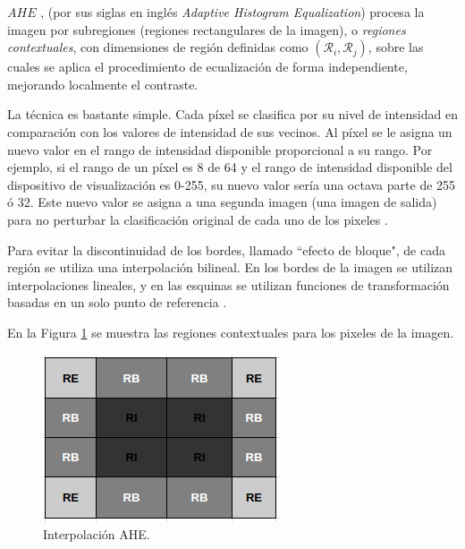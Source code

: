 $AHE$ \cite{chulwoo2013}, (por sus siglas en inglés \textit{Adaptive Histogram Equalization}) procesa la imagen por subregiones (regiones rectangulares de la imagen), o {\it regiones contextuales}, con dimensiones de región definidas como $(\mathcal{R}_i,\mathcal{R}_j)$, sobre las cuales se aplica el procedimiento de ecualización de forma independiente, mejorando localmente el contraste. 

La técnica es bastante simple. Cada píxel se clasifica por su nivel de intensidad en comparación con los valores de intensidad de sus vecinos. Al píxel se le asigna un nuevo valor en el rango de intensidad disponible proporcional a su rango. Por ejemplo, si el rango de un píxel es 8 de 64 y el rango de intensidad disponible del dispositivo de visualización es 0-255, su nuevo valor sería una octava parte de 255 ó 32. Este nuevo valor se asigna a una segunda imagen (una imagen de salida) para no perturbar la clasificación original de cada uno de los pixeles \cite{conf/cbms/Kurak91}.


Para evitar la discontinuidad de los bordes, llamado ``efecto de bloque", de cada región se utiliza una interpolación bilineal. En los bordes de la imagen se utilizan interpolaciones lineales, y en las esquinas se utilizan funciones de transformación basadas en un solo punto de referencia \cite{Zuiderveld1994}. 

En la Figura \ref{AHE_Interpolacion} se muestra las regiones contextuales para los pixeles de la imagen.

\hfill\begin{figure}[H]
  \begin{center}
    \leavevmode
    \includegraphics{Chapter2/Chapter2Figs/AHE-interpolacion.png}
    \caption{Interpolación AHE.}
    \label{AHE_Interpolacion}
  \end{center}
\end{figure}

